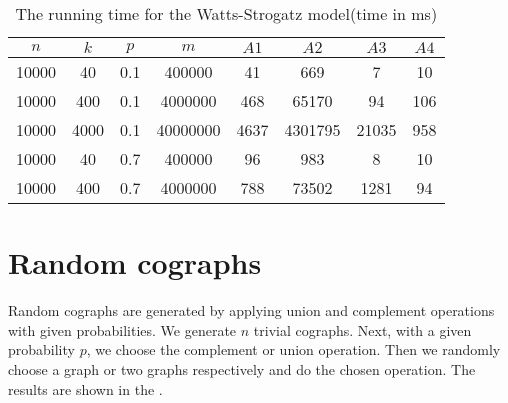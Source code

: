   \begin{center}
  \begin{table}[]
      \centering
    \begin{tabular}[
    caption = {Watts-Strogatz model},
    label = {tbl:watts_strogatz},
  ]{ | c | c | c | c | c | c | c | c |}
  \hline
     $n$ & $k$ & $p$ & $m$ & $A1$ & $A2$ & $A3$ & $A4$ \\ [0.5ex] 
  \hline\hline
   10000 & 40 & 0.1 & 400000 & 41 & 669 & 7 & 10 \\
  \hline
 10000 & 400 & 0.1 & 4000000 & 468 & 65170 & 94 & 106 \\
\hline
 10000 & 4000 & 0.1 & 40000000 & 4637 & 4301795 & 21035 & 958 \\
\hline
 10000 & 40 & 0.7 & 400000 & 96 & 983 & 8 & 10 \\
\hline
 10000 & 400 & 0.7 & 4000000 & 788 & 73502 & 1281 & 94 \\
  \hline
  \end{tabular}
  \caption{The running time for the Watts-Strogatz model(time in ms)}
      \label{tab:watts_strogatz}
  \end{table}
  \end{center}
\section{Random cographs}
Random cographs are generated by applying union and complement operations with given probabilities. We generate $n$ trivial cographs. Next, with a given probability $p$, we choose the complement or union operation. Then we randomly choose a graph or two graphs respectively and do the chosen operation. The results are shown in the . 

